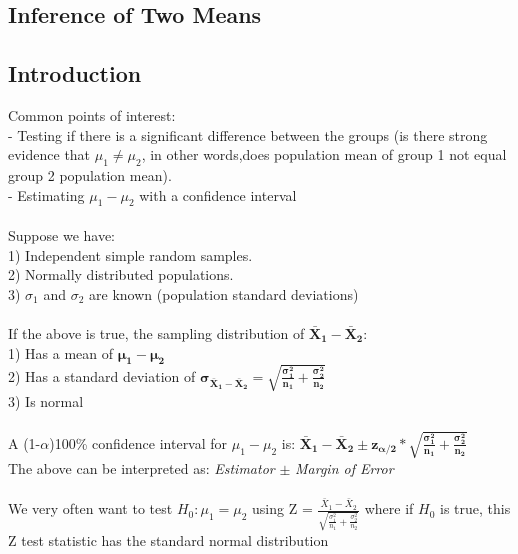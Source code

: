 \documentclass[12pt, a4paper]{article}
\begin{document}
\begin{center} \section{Inference of Two Means} \end{center}
	\subsection{Introduction}
	Common points of interest: \\
	- Testing if there is a significant difference between the groups (is there strong evidence that \hspace*{2mm} $\mu_1 \neq \mu_2$, in other words,does population mean of group 1 not equal group 2 population \hspace*{2mm} mean). \\
	- Estimating $\mu_1 - \mu_2$ with a confidence interval \\~\\
	Suppose we have: \\
	1) Independent simple random samples. \\
	2) Normally distributed populations. \\
	3) $\sigma_1$ and $\sigma_2$ are known (population standard deviations) \\~\\
	If the above is true, the sampling distribution of $\bm{\bar{X}_1 - \bar{X}_2}$: \\
	1) Has a mean of $\bm{\mu_1 - \mu_2}$ \\
	2) Has a standard deviation of $\bm{\sigma_{\bar{X}_1 - \bar{X}_2} = \sqrt{\frac{\sigma_1^2}{n_1}+\frac{\sigma_2^2}{n_2}}}$\\
	3) Is normal \\~\\
	A (1-$\alpha$)100\% confidence interval for $\mu_1 - \mu_2$ is:	$\bm{\bar{X}_1 - \bar{X}_2 \pm z_{\alpha/2}*\sqrt{\frac{\sigma_1^2}{n_1}+\frac{\sigma_2^2}{n_2}}}$ \\ The above can be interpreted as: \textit{Estimator} $\pm$ \textit{Margin of Error} \\~\\
	We very often want to test $H_0: \mu_1 = \mu_2$ using Z = $\frac{\bar{X}_1 - \bar{X}_2}{\sqrt{\frac{\sigma_1^2}{n_1}+\frac{\sigma_2^2}{n_2}}}$ where if $H_0$ is true, this Z test statistic has the standard normal distribution \\~\\
\end{document}
